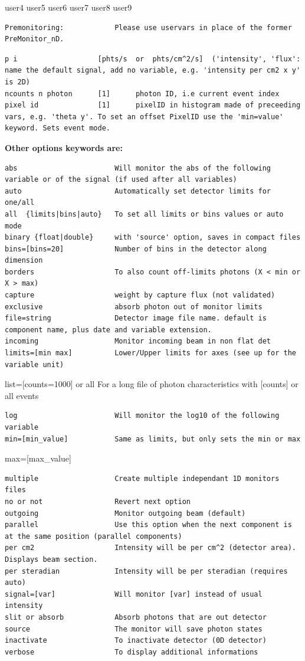 user4 user5 user6 user7 user8 user9

\begin{verbatim}
Premonitoring:            Please use uservars in place of the former PreMonitor_nD.
\end{verbatim}

\begin{verbatim}
p i                   [phts/s  or  phts/cm^2/s]  ('intensity', 'flux': name the default signal, add no variable, e.g. 'intensity per cm2 x y' is 2D)
ncounts n photon      [1]      photon ID, i.e current event index
pixel id              [1]      pixelID in histogram made of preceeding vars, e.g. 'theta y'. To set an offset PixelID use the 'min=value' keyword. Sets event mode.
\end{verbatim}

\textbf{Other options keywords are:}

\begin{verbatim}
abs                       Will monitor the abs of the following variable or of the signal (if used after all variables)
auto                      Automatically set detector limits for one/all
all  {limits|bins|auto}   To set all limits or bins values or auto mode
binary {float|double}     with 'source' option, saves in compact files
bins=[bins=20]            Number of bins in the detector along dimension
borders                   To also count off-limits photons (X < min or X > max)
capture                   weight by capture flux (not validated)
exclusive                 absorb photon out of monitor limits
file=string               Detector image file name. default is component name, plus date and variable extension.
incoming                  Monitor incoming beam in non flat det
limits=[min max]          Lower/Upper limits for axes (see up for the variable unit)
\end{verbatim}

list=[counts=1000] or all For a long file of photon characteristics with [counts] or all events

\begin{verbatim}
log                       Will monitor the log10 of the following variable
min=[min_value]           Same as limits, but only sets the min or max
\end{verbatim}

max=[max\_value]

\begin{verbatim}
multiple                  Create multiple independant 1D monitors files
no or not                 Revert next option
outgoing                  Monitor outgoing beam (default)
parallel                  Use this option when the next component is at the same position (parallel components)
per cm2                   Intensity will be per cm^2 (detector area). Displays beam section.
per steradian             Intensity will be per steradian (requires auto)
signal=[var]              Will monitor [var] instead of usual intensity
slit or absorb            Absorb photons that are out detector
source                    The monitor will save photon states
inactivate                To inactivate detector (0D detector)
verbose                   To display additional informations
\end{verbatim}


